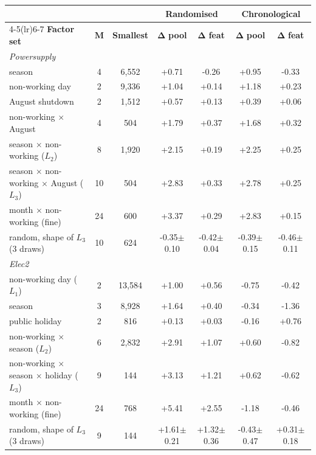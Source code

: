 \begin{tabular}{@{}lcccccc@{}}
\toprule
& & & \multicolumn{2}{c}{\textbf{Randomised}} & \multicolumn{2}{c}{\textbf{Chronological}}\\
\cmidrule(lr){4-5}\cmidrule(lr){6-7}
\textbf{Factor set} & $\boldsymbol{M}$ & \textbf{Smallest} & $\boldsymbol{\Delta}$\textbf{ pool} & $\boldsymbol{\Delta}$\textbf{ feat} & $\boldsymbol{\Delta}$\textbf{ pool} & $\boldsymbol{\Delta}$\textbf{ feat}\\
\midrule
\multicolumn{7}{l}{\textit{Powersupply}}\\
season & 4 & 6,552 & +0.71 & -0.26 & +0.95 & -0.33\\
non-working day & 2 & 9,336 & +1.04 & +0.14 & +1.18 & +0.23\\
August shutdown & 2 & 1,512 & +0.57 & +0.13 & +0.39 & +0.06\\
non-working $\times$ August & 4 & 504 & +1.79 & +0.37 & +1.68 & +0.32\\
season $\times$ non-working ($L_2$) & 8 & 1,920 & +2.15 & +0.19 & +2.25 & +0.25\\
season $\times$ non-working $\times$ August ($L_3$) & 10 & 504 & +2.83 & +0.33 & +2.78 & +0.25\\
month $\times$ non-working (fine) & 24 & 600 & +3.37 & +0.29 & +2.83 & +0.15\\
random, shape of $L_3$ (3 draws) & 10 & 624 & -0.35$\pm$0.10 & -0.42$\pm$0.04 & -0.39$\pm$0.15 & -0.46$\pm$0.11\\
\midrule
\multicolumn{7}{l}{\textit{Elec2}}\\
non-working day ($L_1$) & 2 & 13,584 & +1.00 & +0.56 & -0.75 & -0.42\\
season & 3 & 8,928 & +1.64 & +0.40 & -0.34 & -1.36\\
public holiday & 2 & 816 & +0.13 & +0.03 & -0.16 & +0.76\\
non-working $\times$ season ($L_2$) & 6 & 2,832 & +2.91 & +1.07 & +0.60 & -0.82\\
non-working $\times$ season $\times$ holiday ($L_3$) & 9 & 144 & +3.13 & +1.21 & +0.62 & -0.62\\
month $\times$ non-working (fine) & 24 & 768 & +5.41 & +2.55 & -1.18 & -0.46\\
random, shape of $L_3$ (3 draws) & 9 & 144 & +1.61$\pm$0.21 & +1.32$\pm$0.36 & -0.43$\pm$0.47 & +0.31$\pm$0.18\\
\bottomrule
\end{tabular}
